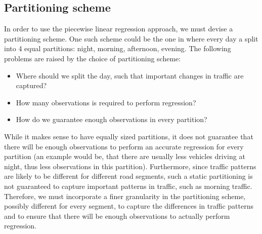 %

\subsection{Partitioning scheme}\label{patterns:segmentation}
In order to use the piecewise linear regression approach, we must devise a partitioning scheme. One such scheme could be the one in  where every day a split into 4 equal partitions: night, morning, afternoon, evening. The following problems are raised by the choice of partitioning scheme:
\begin{itemize}
	\item Where should we split the day, such that important changes in traffic are captured?
	\item How many observations is required to perform regression?
	\item How do we guarantee enough observations in every partition?
\end{itemize}
While it makes sense to have equally sized partitions, it does not guarantee that there will be enough observations to perform an accurate regression for every partition (an example would be, that there are usually less vehicles driving at night, thus less observations in this partition). Furthermore, since traffic patterns are likely to be different for different road segments, such a static partitioning is not guaranteed to capture important patterns in traffic, such as morning traffic. Therefore, we must incorporate a finer granularity in the partitioning scheme, possibly different for every segment, to capture the differences in traffic patterns and to ensure that there will be enough observations to actually perform regression.

